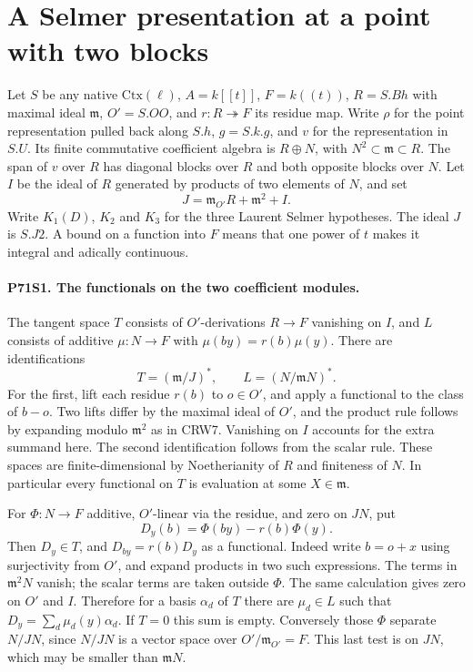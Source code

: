\section{A Selmer presentation at a point with two blocks}

Let $S$ be any native $\mathrm{Ctx}(\ell)$, $A=k[[t]]$,
$F=k((t))$, $R=S.Bh$ with maximal ideal $\mathfrak m$,
$O'=S.OO$, and $r:R\twoheadrightarrow F$ its residue map.
Write $\rho$ for the point representation pulled back along
$S.h$, $g=S.k.g$, and $v$ for the representation in $S.U$.
Its finite commutative coefficient algebra is $R\oplus N$,
with $N^2\subset\mathfrak m\subset R$. The span of $v$ over
$R$ has diagonal blocks over $R$ and both opposite blocks over
$N$. Let $I$ be the ideal of $R$ generated by products of two
elements of $N$, and set
\[
 J=\mathfrak m_{O'}R+\mathfrak m^2+I .
\]
Write $K_1(D)$, $K_2$ and $K_3$ for the three Laurent Selmer hypotheses. The ideal $J$ is $S.J2$. A bound on a function into $F$ means that one power of
$t$ makes it integral and adically continuous.

\paragraph{P71S1. The functionals on the two coefficient modules.}
The tangent space $T$ consists of $O'$-derivations $R\to F$
vanishing on $I$, and $L$ consists of additive $\mu:N\to F$
with $\mu(by)=r(b)\mu(y)$. There are identifications
\[
 T=(\mathfrak m/J)^*,\qquad L=(N/\mathfrak mN)^* .
\]
For the first, lift each residue $r(b)$ to $o\in O'$, and apply
a functional to the class of $b-o$. Two lifts differ by the
maximal ideal of $O'$, and the product rule follows by expanding
modulo $\mathfrak m^2$ as in CRW7. Vanishing on $I$ accounts
for the extra summand here. The second identification follows
from the scalar rule. These spaces are finite-dimensional by
Noetherianity of $R$ and finiteness of $N$. In particular every
functional on $T$ is evaluation at some $X\in\mathfrak m$.

For $\Phi:N\to F$ additive, $O'$-linear via the residue, and
zero on $JN$, put
\[
 D_y(b)=\Phi(by)-r(b)\Phi(y).
\]
Then $D_y\in T$, and $D_{b y}=r(b)D_y$ as a functional.
Indeed write $b=o+x$ using surjectivity from $O'$, and expand
products in two such expressions. The terms in $\mathfrak m^2N$
vanish; the scalar terms are taken outside $\Phi$. The same
calculation gives zero on $O'$ and $I$. Therefore for a basis
$\alpha_d$ of $T$ there are $\mu_d\in L$ such that
$D_y=\sum_d\mu_d(y)\alpha_d$. If $T=0$ this sum is empty.
Conversely those $\Phi$ separate $N/JN$, since $N/JN$ is a
vector space over $O'/\mathfrak m_{O'}=F$. This last test is
on $JN$, which may be smaller than $\mathfrak m N$.

